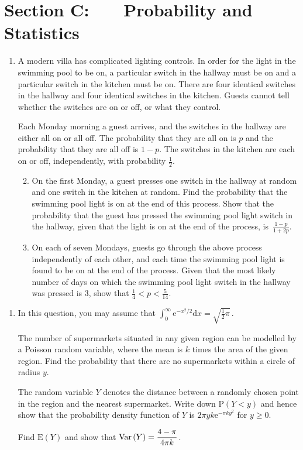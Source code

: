 \documentclass[a4, 11pt]{report}
\newlength{\qspace}
\newcounter{qnumber}
\newenvironment{question}%
 {\vspace{\qspace}
  \begin{enumerate}[\bfseries 1\quad][10]%
    \setcounter{enumi}{\value{qnumber}}%
    \item%
 }
{
  \end{enumerate}
  \filbreak
  \stepcounter{qnumber}
 }
\newenvironment{questionparts}[1][1]%
 {
  \begin{enumerate}[\bfseries (i)]%
    \setcounter{enumii}{#1}
    \addtocounter{enumii}{-1}
    \setlength{\itemsep}{5mm}
    \setlength{\parskip}{8pt}
 }
 {
  \end{enumerate}
 }
\def\d{{\mathrm d}}
\def\e{{\mathrm e}}
\def\E{{\mathrm E}}
\def\P{{\mathrm P}}
\def\ge{\geqslant}
\def\var{{\rm Var}\,}
\begin{document}
	
	\newpage
\section*{Section C: \ \ \ Probability and Statistics}


\begin{question}
A modern villa has complicated lighting controls. In order 
for the light in the swimming pool to be on, a particular switch in the 
hallway must be on and a particular switch in the kitchen must be on.
There are four identical switches in the hallway and
four identical switches in the kitchen. Guests
cannot tell whether the switches are on or off, or what they 
control.

Each Monday morning a guest arrives, and 
the switches in the hallway are either all  on or all off.
The  probability that they are all on is $p$
and the  probability that they are all off is $1-p$.
The switches in the kitchen are each on or off, independently,
 with probability
$\frac12$. 

\begin{questionparts}
\item
On the first Monday, a guest 
presses one switch in the hallway at random and one 
switch in the kitchen at random. Find the probability that
the swimming pool light is on at the end of this process.
Show that the probability that the guest has pressed the 
 swimming pool light switch
in the hallway, given that the light is on at the end of the process,
is~$\displaystyle \frac{1-p}{1+2p}$.

\item On each of seven Mondays,  guests go through the above process
independently of each other, and each time the swimming pool light
is found to be on at the end of the process.
 Given that the most likely number of days on which
 the swimming pool light switch in the hallway was pressed is 3, 
show that $\frac14 <p< \frac{5}{14}$.
\end{questionparts}
\end{question}

\begin{question}
In this question, you may assume that 
$\displaystyle \int_0^\infty \!\!\! 
\e^{-x^2/2} \d x = \sqrt{\tfrac12 \pi}\,$.

The number of supermarkets situated in any given region
can be modelled by a Poisson random variable, where the 
mean is $k$ times the area of the given region.
Find the probability that
there are no supermarkets  within a circle of radius $y$.

The random variable $Y$ denotes the distance
between a randomly chosen point in the region and
the nearest  supermarket. Write down
$\P(Y<y)$ and hence show that the probability density function
of $Y$ is  $\displaystyle 2\pi y k \e^{-\pi k y^2}$ for $y\ge0$.

Find $\E(Y)$ and show that $\var(Y) = \dfrac{4-\pi}{4\pi k}$.  
\end{question}
\end{document}
